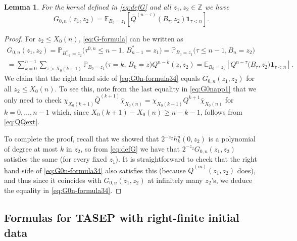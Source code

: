 \documentclass[letterpaper,reqno,11pt,oneside,final]{amsart}
\newtheorem{lem}[thm]{Lemma}
\theoremstyle{definition}
\newcommand{\pp}{\mathbb{P}}
\newcommand{\ee}{\mathbb{E}}
\newcommand{\zz}{\mathbb{Z}}
\newcommand{\uno}[1]{\mathbf{1}_{#1}}
\newcommand{\mQ}{\bar{Q}}
\renewcommand{\P}{\chi}
\numberwithin{equation}{section}
\begin{document}
\begin{lem}\label{lem:G0n-formula}
For the kernel defined in \eqref{eq:defG} and all $z_1,z_2\in\zz$ we have
\begin{equation}\label{eq:G0n-formula34}
G_{0,n}(z_1,z_2) = \ee_{B_0=z_1}\!\left[ \mQ^{(n - \tau)}(B_{\tau}, z_2)\uno{\tau<n}\right].
\end{equation}
\end{lem}

\begin{proof}
For $z_2\leq X_0(n)$, \eqref{eq:G-formula} can be written as
\begin{multline}\label{eq:G0napp1}
G_{0,n}(z_1,z_2)=\pp_{B^*_{-1}=z_2}\big(\tau^{0,n}\leq n-1,\,B^*_{n-1}=z_1\big)=\pp_{B_{0}=z_1}\big(\tau\leq n-1,B_{n}=z_2\big)\\
 =\sum_{k=0}^{n-1}\sum_{z>X_0(k+1)}\pp_{B_{0}=z_1}\big(\tau=k,\,B_{k}=z\big)Q^{n-k}(z,z_2)
 =\ee_{B_0=z_1}\!\left[Q^{n-\tau}\big(B_{\tau},z_2\big)\uno{\tau<n}\right].
\end{multline}
We claim that the right hand side of \eqref{eq:G0n-formula34} equals $G_{0,n}(z_1,z_2)$ for all $z_2\leq X_0(n)$.
To see this, note from the last equality in \eqref{eq:G0napp1} that we only need to check $\P_{X_0(k+1)}\mQ^{(k+1)}\bar\P_{X_0(n)}=\P_{X_0(k+1)}{Q^{k+1}}\bar\P_{X_0(n)}$ for $k=0,\dotsc,n-1$ which, since $X_0(k+1)-X_0(n)\geq n-k-1$, follows from \eqref{eq:QQext}.

To complete the proof, recall that we showed that $2^{-z_2}h^n_k(0,z_2)$ is a polynomial of degree at most $k$ in $z_2$, so from \eqref{eq:defG} we have that $2^{-z_2}G_{0,n}(z_1,z_2)$ satisfies the same (for every fixed $z_1$).
It is straightforward to check that the right hand side of \eqref{eq:G0n-formula34} also satisfies this (because $\mQ^{(m)}(z_1,z_2)$ does), and thus since it coincides with $G_{0,n}(z_1,z_2)$ at infinitely many $z_2$'s, we deduce the equality in \eqref{eq:G0n-formula34}.  
\end{proof}

\subsection{Formulas for TASEP with right-finite initial data} 
\label{subsec:TASEPformulas}
\end{document}
